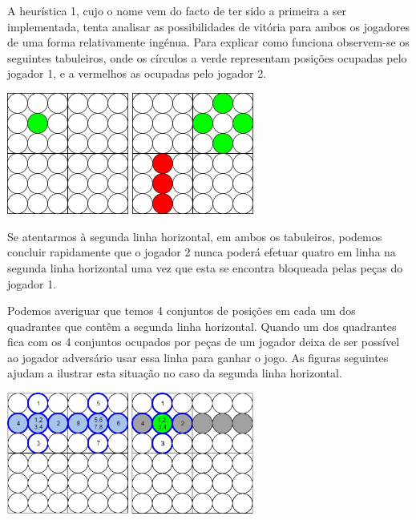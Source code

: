 
A heurística 1, cujo o nome vem do facto de ter sido a primeira a ser implementada, tenta analisar as possibilidades de vitória para ambos os jogadores de uma forma relativamente ingénua. Para explicar como funciona observem-se os seguintes tabuleiros, onde os círculos a verde representam posições ocupadas pelo jogador 1, e a vermelhos as ocupadas pelo jogador 2.

\begin{table}[H]
\centering
\includegraphics[height=4cm]{images/h1_block1.jpg}
\includegraphics[height=4cm]{images/h1_block2.jpg}
\end{table}

Se atentarmos à segunda linha horizontal, em ambos os tabuleiros, podemos concluir rapidamente que o jogador 2 nunca poderá efetuar quatro em linha na segunda linha horizontal uma vez que esta se encontra bloqueada pelas peças do jogador 1. 

Podemos averiguar que temos 4 conjuntos de posições em cada um dos quadrantes que contêm a segunda linha horizontal. Quando um dos quadrantes fica com os 4 conjuntos ocupados por peças de um jogador deixa de ser possível ao jogador adversário usar essa linha para ganhar o jogo. As figuras seguintes ajudam a ilustrar esta situação no caso da segunda linha horizontal. 

\begin{table}[H]
\centering
\includegraphics[height=4cm]{images/h1_pattern1.jpg}
\includegraphics[height=4cm]{images/h1_block3.jpg}
\end{table}

